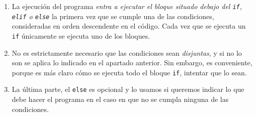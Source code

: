 \begin{enumerate}
\item La ejecuci\'on del programa {\itshape entra a ejecutar el bloque
situado debajo del \lstinline|if|, \lstinline|elif| o  \lstinline|else|} la
primera vez que se cumple una de las condiciones, consideradas en orden
descendente en el c\'odigo. Cada vez que se ejecuta un \lstinline|if|
\'unicamente se ejecuta uno de los bloques. 

\item No es estrictamente necesario que las condiciones sean {\itshape
disjuntas}, y si no lo son se aplica lo indicado en el apartado anterior. Sin
embargo, es conveniente, porque es m\'as claro c\'omo se ejecuta todo el bloque
\lstinline|if|, intentar que lo sean. 

\item La última parte,  el \lstinline|else| es opcional y lo usamos si
queremos 
indicar lo que debe hacer el programa en el caso en que no se cumpla ninguna
de las condiciones.
 
 
\end{enumerate}





